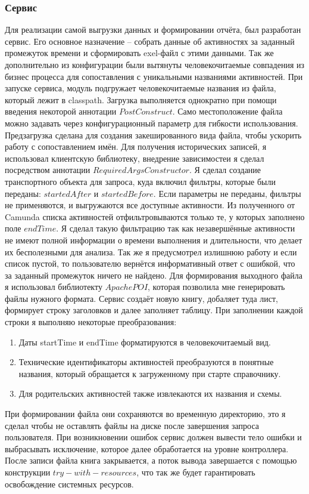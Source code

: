 \subsubsection{Сервис}

Для реализации самой выгрузки данных и формировании отчёта, 
был разработан сервис. Его основное назначение -- собрать данные об активностях за заданный промежуток времени и 
сформировать exel-файл с этими данными. Так же дополнительно из конфигурации были вытянуты человекочитаемые совпадения из бизнес процесса для сопоставления с 
уникальными названиями активностей. При запуске сервиса, модуль подгружает человекочитаемые названия из файла, который лежит в classpath. 
Загрузка выполняется однократно при помощи введения некоторой аннотации $PostConstruct$. 
Само местоположение файла можно задавать через конфигурационный параметр для гибкости использования.
Предзагрузка сделана для создания закешированного вида файла, чтобы ускорить работу с сопоставлением имён.
Для получения исторических записей, я использовал клиентскую библиотеку, внедрение зависимостеи я сделал посредством аннотации $RequiredArgsConstructor$.
Я сделал создание транспортного объекта для запроса, куда включил фильтры, которые были переданы: $startedAfter$ и $startedBefore$.
Если параметры не переданы, фильтры не применяются, и выгружаются все доступные активности.
Из полученного от Camunda списка активностей отфильтровываются только те, у которых заполнено поле $endTime$. 
Я сделал такую фильтрацию так как незавершённые активности не имеют полной информации о времени выполнения и длительности, что делает их бесполезными для анализа.
Так же я предусмотрел излишнюю работу и если список пустой, то пользователю вернётся информативный ответ с ошибкой, что за заданный промежуток ничего не найдено.
Для формирования выходного файла я использовал библиотекту $Apache POI$, которая позволила мне генерировать файлы нужного формата.
Сервис создаёт новую книгу, добаляет туда лист, формирует строку заголовков и далее заполняет таблицу.
При заполнении каждой строки я выполняю некоторые преобразования: 
\begin{enumerate}
  \item Даты startTime и endTime форматируются в человекочитаемый вид.
  \item Технические идентификаторы активностей преобразуются в понятные названия, который обращается к загруженному при старте справочнику.
  \item Для родительских активностей также извлекаются их названия и схемы.
\end{enumerate}
При формировании файла они сохраняются во временную директорию, это я сделал чтобы
не оставлять файлы на диске после завершения запроса пользователя. При возникновении ошибок сервис должен вывести тело ошибки и выбрасывать исключение, которое далее обработается на уровне контроллера.
После записи файла книга закрывается, а поток вывода завершается с помощью конструкции $ try-with-resources$, что так же будет гарантировать освобождение системных ресурсов.

